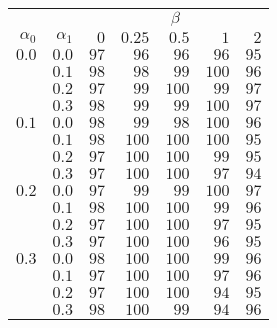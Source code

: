 \begin{tabular}{rr|rrrrr}
\hline\hline
 && \multicolumn{5}{c}{$\beta$}\\
 $\alpha_0$ & $\alpha_1$ & $0$ & $0.25$ & $0.5$ & $1$ & $2$ \\ 
 \hline
$0.0$ & $0.0$ & $97$ & $96$ & $96$ & $96$ & $95$\\ 
 & $0.1$ & $98$ & $98$ & $99$ & $100$ & $96$\\ 
 & $0.2$ & $97$ & $99$ & $100$ & $99$ & $97$\\ 
 & $0.3$ & $98$ & $99$ & $99$ & $100$ & $97$\\ 
\hline 
 $0.1$ & $0.0$ & $98$ & $99$ & $98$ & $100$ & $96$\\ 
 & $0.1$ & $98$ & $100$ & $100$ & $100$ & $95$\\ 
 & $0.2$ & $97$ & $100$ & $100$ & $99$ & $95$\\ 
 & $0.3$ & $97$ & $100$ & $100$ & $97$ & $94$\\ 
\hline 
 $0.2$ & $0.0$ & $97$ & $99$ & $99$ & $100$ & $97$\\ 
 & $0.1$ & $98$ & $100$ & $100$ & $99$ & $96$\\ 
 & $0.2$ & $97$ & $100$ & $100$ & $97$ & $95$\\ 
 & $0.3$ & $97$ & $100$ & $100$ & $96$ & $95$\\ 
\hline 
 $0.3$ & $0.0$ & $98$ & $100$ & $100$ & $99$ & $96$\\ 
 & $0.1$ & $97$ & $100$ & $100$ & $97$ & $96$\\ 
 & $0.2$ & $97$ & $100$ & $100$ & $94$ & $95$\\ 
 & $0.3$ & $98$ & $100$ & $99$ & $94$ & $96$\\ 
 \hline 
 \end{tabular}